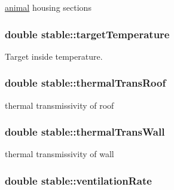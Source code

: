 \hyperlink{classanimal}{animal} housing sections \hypertarget{classstable_a1c1bad0f5a3fdbf212f8396eda0d29b2}{
\subsubsection[{targetTemperature}]{\setlength{\rightskip}{0pt plus 5cm}double {\bf stable::targetTemperature}}}
\label{classstable_a1c1bad0f5a3fdbf212f8396eda0d29b2}


Target inside temperature. \hypertarget{classstable_acdaf9b3f72667dc54be6b995cbf22e8d}{
\subsubsection[{thermalTransRoof}]{\setlength{\rightskip}{0pt plus 5cm}double {\bf stable::thermalTransRoof}}}
\label{classstable_acdaf9b3f72667dc54be6b995cbf22e8d}


thermal transmissivity of roof \hypertarget{classstable_afe7c8a3b3520bc4cdecaa787336c38d4}{
\subsubsection[{thermalTransWall}]{\setlength{\rightskip}{0pt plus 5cm}double {\bf stable::thermalTransWall}}}
\label{classstable_afe7c8a3b3520bc4cdecaa787336c38d4}


thermal transmissivity of wall \hypertarget{classstable_a934e5c5203ed1c98f304d28c119b219b}{
\subsubsection[{ventilationRate}]{\setlength{\rightskip}{0pt plus 5cm}double {\bf stable::ventilationRate}}}
\label{classstable_a934e5c5203ed1c98f304d28c119b219b}


